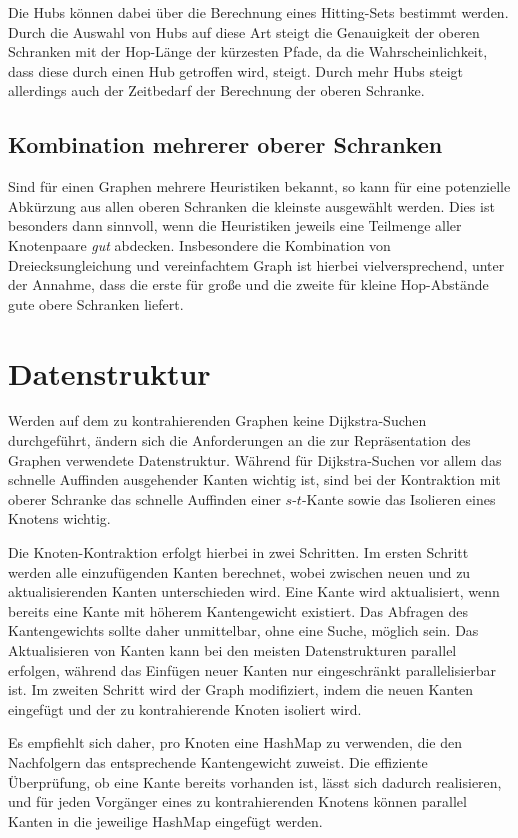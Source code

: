 Die Hubs können dabei über die Berechnung eines Hitting-Sets bestimmt werden.
Durch die Auswahl von Hubs auf diese Art steigt die Genauigkeit der oberen Schranken mit der Hop-Länge der kürzesten Pfade, da die Wahrscheinlichkeit, dass diese durch einen Hub getroffen wird, steigt.
Durch mehr Hubs steigt allerdings auch der Zeitbedarf der Berechnung der oberen Schranke.

\subsection{Kombination mehrerer oberer Schranken}
Sind für einen Graphen mehrere Heuristiken bekannt, so kann für eine potenzielle Abkürzung aus allen oberen Schranken die kleinste ausgewählt werden.
Dies ist besonders dann sinnvoll, wenn die Heuristiken jeweils eine Teilmenge aller Knotenpaare \emph{gut} abdecken.
Insbesondere die Kombination von Dreiecksungleichung und vereinfachtem Graph ist hierbei vielversprechend, unter der Annahme, dass die erste für große und die zweite für kleine Hop-Abstände gute obere Schranken liefert.

\section{Datenstruktur}

Werden auf dem zu kontrahierenden Graphen keine Dijkstra-Suchen durchgeführt, ändern sich die Anforderungen an die zur Repräsentation des Graphen verwendete Datenstruktur.
Während für Dijkstra-Suchen vor allem das schnelle Auffinden ausgehender Kanten wichtig ist, sind bei der Kontraktion mit oberer Schranke das schnelle Auffinden einer $s$-$t$-Kante sowie das Isolieren eines Knotens wichtig.

Die Knoten-Kontraktion erfolgt hierbei in zwei Schritten.
Im ersten Schritt werden alle einzufügenden Kanten berechnet, wobei zwischen neuen und zu aktualisierenden Kanten unterschieden wird.
Eine Kante wird aktualisiert, wenn bereits eine Kante mit höherem Kantengewicht existiert.
Das Abfragen des Kantengewichts sollte daher unmittelbar, ohne eine Suche, möglich sein.
Das Aktualisieren von Kanten kann bei den meisten Datenstrukturen parallel erfolgen, während das Einfügen neuer Kanten nur eingeschränkt parallelisierbar ist.
Im zweiten Schritt wird der Graph modifiziert, indem die neuen Kanten eingefügt und der zu kontrahierende Knoten isoliert wird.

Es empfiehlt sich daher, pro Knoten eine HashMap zu verwenden, die den Nachfolgern das entsprechende Kantengewicht zuweist.
Die effiziente Überprüfung, ob eine Kante bereits vorhanden ist, lässt sich dadurch realisieren, und für jeden Vorgänger eines zu kontrahierenden Knotens können parallel Kanten in die jeweilige HashMap eingefügt werden.
